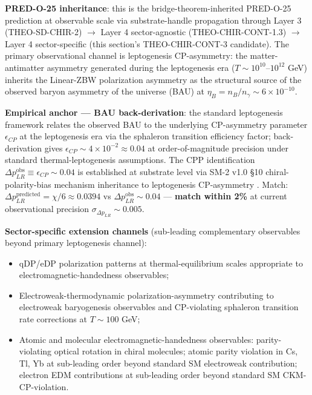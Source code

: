 \documentclass[11pt,letterpaper]{article}
\newcommand{\DeltapLR}{\Delta p_{LR}}
\begin{document}
\textbf{PRED-O-25 inheritance}: this is the bridge-theorem-inherited PRED-O-25 prediction at observable scale via substrate-handle propagation through Layer 3 (THEO-SD-CHIR-2) $\to$ Layer 4 sector-agnostic (THEO-CHIR-CONT-1.3) $\to$ Layer 4 sector-specific (this section's THEO-CHIR-CONT-3 candidate). The primary observational channel is leptogenesis CP-asymmetry: the matter-antimatter asymmetry generated during the leptogenesis era ($T \sim 10^{10}$--$10^{12}$ GeV) inherits the Linear-ZBW polarization asymmetry as the structural source of the observed baryon asymmetry of the universe (BAU) at $\eta_B = n_B/n_\gamma \sim 6 \times 10^{-10}$.

\textbf{Empirical anchor --- BAU back-derivation}: the standard leptogenesis framework \cite{DavidsonNardiNir} relates the observed BAU to the underlying CP-asymmetry parameter $\epsilon_{CP}$ at the leptogenesis era via the sphaleron transition efficiency factor; back-derivation gives $\epsilon_{CP} \sim 4 \times 10^{-2} \approx 0.04$ at order-of-magnitude precision under standard thermal-leptogenesis assumptions. The CPP identification $\DeltapLR^{\text{obs}} \equiv \epsilon_{CP} \sim 0.04$ is established at substrate level via SM-2 v1.0 §10 chiral-polarity-bias mechanism inheritance to leptogenesis CP-asymmetry \cite{SM2v1}. Match: $\DeltapLR^{\text{predicted}} = \chi/6 \approx 0.0394$ vs $\DeltapLR^{\text{obs}} \sim 0.04$ --- \textbf{match within 2\%} at current observational precision $\sigma_{\DeltapLR} \sim 0.005$.

\textbf{Sector-specific extension channels} (sub-leading complementary observables beyond primary leptogenesis channel):

\begin{itemize}[leftmargin=*]
\item qDP/eDP polarization patterns at thermal-equilibrium scales appropriate to electromagnetic-handedness observables;
\item Electroweak-thermodynamic polarization-asymmetry contributing to electroweak baryogenesis observables and CP-violating sphaleron transition rate corrections at $T \sim 100$ GeV;
\item Atomic and molecular electromagnetic-handedness observables: parity-violating optical rotation in chiral molecules; atomic parity violation in Cs, Tl, Yb at sub-leading order beyond standard SM electroweak contribution; electron EDM contributions at sub-leading order beyond standard SM CKM-CP-violation.
\end{itemize}
\end{document}
